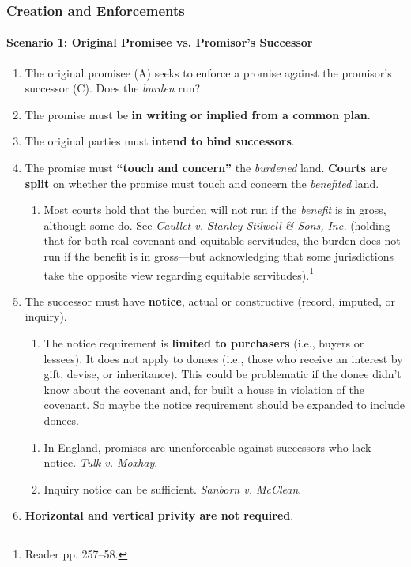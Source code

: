 \subsubsection{Creation and Enforcements}

\paragraph{Scenario 1: Original Promisee vs. Promisor's Successor}

\begin{enumerate}
    \item The original promisee (A) seeks to enforce a promise against the 
    promisor's  successor (C). Does the \emph{burden} run?
    \item The promise must be \textbf{in writing or implied from a common 
    plan}.
    \item The original parties must \textbf{intend to bind successors}.
    \item The promise must \textbf{``touch and concern''} the \emph{burdened} 
    land. \textbf{Courts are split} on whether the promise must touch and 
    concern the \emph{benefited} land.
    \begin{enumerate}
        \item Most courts hold that the burden will not run if the 
        \emph{benefit} is in gross, although some do. See \emph{Caullet v. 
        Stanley Stilwell \& Sons, Inc.} (holding that for both real covenant 
        and equitable servitudes, the burden does not run 
        if the benefit is in gross---but acknowledging that some jurisdictions 
        take the opposite view regarding equitable 
        servitudes).\footnote{Reader pp. 257--58.}
    \end{enumerate}
    \item The successor must have \textbf{notice}, actual or constructive 
    (record, imputed, or inquiry).
    \begin{enumerate}
        \item The notice requirement is \textbf{limited to purchasers} (i.e., 
        buyers or lessees). It does not apply to donees (i.e., those who 
        receive an interest by gift, devise, or inheritance). This could be 
        problematic if the donee didn't know about the covenant and, for 
        built a house in violation of the covenant. So maybe the notice 
        requirement should be expanded to include donees. 
    \end{enumerate}
    \begin{enumerate}
        \item In England, promises are unenforceable against successors who 
        lack notice. \emph{Tulk v. Moxhay}.
        \item Inquiry notice can be sufficient. \emph{Sanborn v. McClean}.
    \end{enumerate}
    \item \textbf{Horizontal and vertical privity are not required}.
\end{enumerate}


